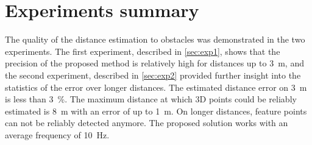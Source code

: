 \section{Experiments summary}
The quality of the distance estimation to obstacles was demonstrated in the two experiments.
The first experiment, described in \autoref{sec:exp1}, shows that the precision of the proposed method is relatively high for distances up to \SI{3}{\meter}, and the second experiment, described in \autoref{sec:exp2} provided further insight into the statistics of the error over longer distances. 
The estimated distance error on \SI{3}{\meter} is less than \qty{3}{\percent}.
The maximum distance at which 3D points could be reliably estimated is \SI{8}{\meter} with an error of up to \SI{1}{\meter}.
On longer distances, feature points can not be reliably detected anymore.
The proposed solution works with an average frequency of \SI{10}{\hertz}.
